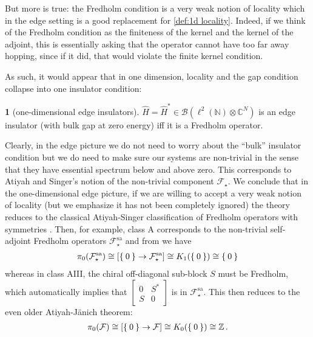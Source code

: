 \documentclass[a4paper,10pt]{article}
\numberwithin{equation}{section}
\theoremstyle{plain}
\theoremstyle{plain}
\theoremstyle{plain}
\theoremstyle{plain}
\theoremstyle{plain}
\theoremstyle{remark}
\theoremstyle{definition}
\newtheorem{defn}[thm]{\protect\definitionname}
\theoremstyle{plain}
\providecommand{\definitionname}{Definition}
\newcommand{\ZZ}{\mathbb{Z}}
\newcommand{\NN}{\mathbb{N}}
\newcommand{\CC}{\mathbb{C}}
\newcommand{\calB}{\mathcal{B}}
\newcommand{\calF}{\mathcal{F}}
\newcommand{\quotes}[1]{``#1''}
\newcommand{\eq}[1]{\begin{align*}#1\end{align*}}
\begin{document}
	But more is true: the Fredholm condition is a very weak notion of locality which in the edge setting is a good replacement for \cref{def:1d locality}. Indeed, if we think of the Fredholm condition as the finiteness of the kernel and the kernel of the adjoint, this is essentially asking that the operator cannot have too far away hopping, since if it did, that would violate the finite kernel condition.
	
	As such, it would appear that in one dimension, locality and the gap condition collapse into one insulator condition: 
	\begin{defn}[one-dimensional edge insulators]\label{def:1d edge insulators} $\widehat{H}=\widehat{H}^\ast\in\calB(\ell^2(\NN)\otimes\CC^N)$ is an edge insulator (with bulk gap at zero energy) iff it is a Fredholm operator.
	\end{defn}
	
	Clearly, in the edge picture we do not need to worry about the \quotes{bulk} insulator condition but we do need to make sure our systems are non-trivial in the sense that they have essential spectrum below and above zero. This corresponds to Atiyah and Singer's notion of the non-trivial component $\calF_\star$. We conclude that in the one-dimensional edge picture, if we are willing to accept a very weak notion of locality (but we emphasize it has not been completely ignored) the theory reduces to the classical Atiyah-Singer classification of Fredholm operators with symmetries \cite{AtiyahSinger1969}. Then, for example, class A corresponds to the non-trivial self-adjoint Fredholm operators $\calF^{\mathrm{sa}}_\star$ and from \cite{AtiyahSinger1969} we have \eq{\pi_0(\calF^{\mathrm{sa}}_\star)\cong \left[\Set{0}\to\calF^{\mathrm{sa}}_\star\right]\cong K_1(\Set{0})\cong\Set{0}} whereas in class AIII, the chiral off-diagonal sub-block $S$ must be Fredholm, which automatically implies that $\begin{bmatrix}
		0 & S^\ast\\S&0
	\end{bmatrix}$ is in $\calF^{\mathrm{sa}}_\star$. This then reduces to the even older Atiyah-J\"anich theorem: \eq{\pi_0(\calF) \cong \left[\Set{0}\to\calF\right]\cong K_0(\Set{0})\cong \ZZ\,.}
	
\end{document}
